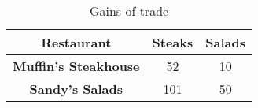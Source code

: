 \begin{table}[h]
  \centering
    \begin{tabular}{|c|c|c|}
      \hline
      \textbf{Restaurant} & \textbf{Steaks} & \textbf{Salads} \\
      \hline
      \textbf{Muffin's Steakhouse} & 52 & 10 \\
      \hline
      \textbf{Sandy's Salads} & 101 & 50 \\
      \hline
    \end{tabular}
    \caption{Gains of trade}
  \end{table}